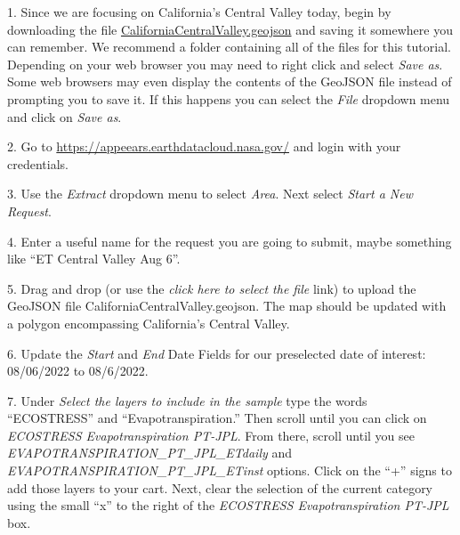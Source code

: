 \documentclass[oneside,a4paper,11pt,explicit]{book}
\begin{document}
1. Since we are focusing on California's Central Valley today, begin by downloading the file \href{https://jeremydforsythe.github.io/icecream-tutorials/Tutorial6_Evaportranspiration1/CaliforniaCentralValley.geojson}{CaliforniaCentralValley.geojson} and saving it somewhere you can remember. We recommend a folder containing all of the files for this tutorial. Depending on your web browser you may need to right click and select \textit{Save as}. Some web browsers may even display the contents of the GeoJSON file instead of prompting you to save it. If this happens you can select the \textit{File} dropdown menu and click on \textit{Save as}. 


2. Go to \href{https://appeears.earthdatacloud.nasa.gov/}{https://appeears.earthdatacloud.nasa.gov/} and login with your credentials. 

3. Use the \textit{Extract} dropdown menu to select \textit{Area}. Next select \textit{Start a New Request}. 

4. Enter a useful name for the request you are going to submit, maybe something like ``ET Central Valley Aug 6''. 

5. Drag and drop (or use the \textit{click here to select the file} link) to upload the GeoJSON file CaliforniaCentralValley.geojson. The map should be updated with a polygon encompassing California's Central Valley.

6. Update the \textit{Start} and \textit{End} Date Fields for our preselected date of interest: 08/06/2022 to 08/6/2022.

7. Under \textit{Select the layers to include in the sample} type the words ``ECOSTRESS'' and ``Evapotranspiration.'' Then scroll until you can click on \textit{ECOSTRESS Evapotranspiration PT-JPL}. From there, scroll until you see \textit{EVAPOTRANSPIRATION\_PT\_JPL\_ETdaily} and \textit{EVAPOTRANSPIRATION\_PT\_JPL\_ETinst} options. Click on the ``+'' signs to add those layers to your cart. Next, clear the selection of the current category using the small ``x'' to the right of the \textit{ECOSTRESS Evapotranspiration PT-JPL} box.
\end{document}
